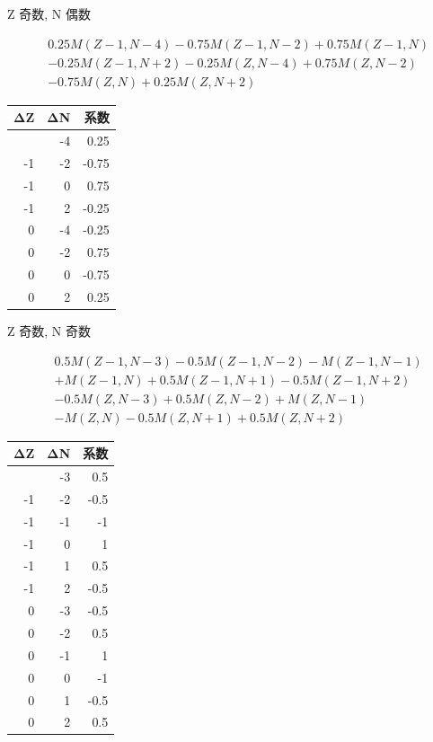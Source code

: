 \documentclass[
  11pt,
  letterpaper,
]{article}
\begin{document}
Z 奇数, N 偶数

\[
\begin{aligned}
& 0.25M(Z-1,N-4)-0.75M(Z-1,N-2)+0.75M(Z-1,N) \\
& -0.25M(Z-1,N+2)-0.25M(Z,N-4)+0.75M(Z,N-2) \\
& -0.75M(Z,N)+0.25M(Z,N+2)
\end{aligned}
\]

\begin{longtable}[]{@{}rrr@{}}
\toprule\noalign{}
ΔZ & ΔN & 系数 \\
\midrule\noalign{}
\endhead
\bottomrule\noalign{}
\endlastfoot
-1 & -4 & 0.25 \\
-1 & -2 & -0.75 \\
-1 & 0 & 0.75 \\
-1 & 2 & -0.25 \\
0 & -4 & -0.25 \\
0 & -2 & 0.75 \\
0 & 0 & -0.75 \\
0 & 2 & 0.25 \\
\end{longtable}

Z 奇数, N 奇数

\[
\begin{aligned}
& 0.5M(Z-1,N-3)-0.5M(Z-1,N-2)-M(Z-1,N-1) \\
& +M(Z-1,N)+0.5M(Z-1,N+1)-0.5M(Z-1,N+2) \\
& -0.5M(Z,N-3)+0.5M(Z,N-2)+M(Z,N-1) \\
& -M(Z,N)-0.5M(Z,N+1)+0.5M(Z,N+2)
\end{aligned}
\]

\begin{longtable}[]{@{}rrr@{}}
\toprule\noalign{}
ΔZ & ΔN & 系数 \\
\midrule\noalign{}
\endhead
\bottomrule\noalign{}
\endlastfoot
-1 & -3 & 0.5 \\
-1 & -2 & -0.5 \\
-1 & -1 & -1 \\
-1 & 0 & 1 \\
-1 & 1 & 0.5 \\
-1 & 2 & -0.5 \\
0 & -3 & -0.5 \\
0 & -2 & 0.5 \\
0 & -1 & 1 \\
0 & 0 & -1 \\
0 & 1 & -0.5 \\
0 & 2 & 0.5 \\
\end{longtable}
\end{document}
